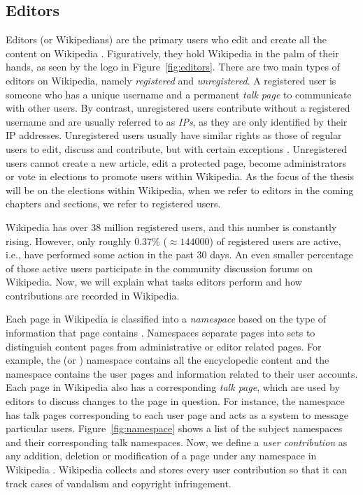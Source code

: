 \subsection{Editors}
\label{subsec:editors}
Editors (or Wikipedians) are the primary users who edit and create all the content on Wikipedia \cite{wiki:editors}.
Figuratively, they hold Wikipedia in the palm of their hands, as seen by the logo in Figure~\ref{fig:editors}.
There are two main types of editors on Wikipedia, namely \textit{registered} and \textit{unregistered}.
A registered user is someone who has a unique username and a permanent \textit{talk page} to communicate with other users.
By contrast, unregistered users contribute without a registered username and are usually referred to as \textit{IPs}, as they are only identified by their IP addresses.
Unregistered users usually have similar rights as those of regular users to edit, discuss and contribute, but with certain exceptions 
\cite{wiki:unregistered-users}.
Unregistered users cannot create a new article, edit a protected page, become administrators or vote in elections to promote users within Wikipedia.
As the focus of the thesis will be on the elections within Wikipedia, when we refer to editors in the coming chapters and sections, we refer to registered users.

Wikipedia has over 38 million registered users, and this number is constantly rising.
However, only roughly $0.37\%$ ($\approx 144000$) of registered users are active, i.e., have performed some action in the past 30 days.
An even smaller percentage of those active users participate in the community discussion forums on Wikipedia.
Now, we will explain what tasks editors perform and how contributions are recorded in Wikipedia.

Each page in Wikipedia is classified into a \textit{namespace} based on the type of information that page contains \cite{wiki:namespace}.
Namespaces separate pages into sets to distinguish content pages from administrative or editor related pages.
For example, the \mainNS (or \articleNS) namespace contains all the encyclopedic content and the \userNS namespace contains the user pages and information related to their user accounts.
Each page in Wikipedia also has a corresponding \textit{talk page}, which are used by editors to discuss changes to the page in question.
For instance, the \usertalkNS namespace has talk pages corresponding to each user page and acts as a system to message particular users.
Figure~\ref{fig:namespace} shows a list of the subject namespaces and their corresponding talk namespaces.
Now, we define a \textit{user contribution} as any addition, deletion or modification of a page under any namespace in Wikipedia \cite{wiki:user-contribs}.
Wikipedia collects and stores every user contribution so that it can track cases of vandalism and copyright infringement. 

